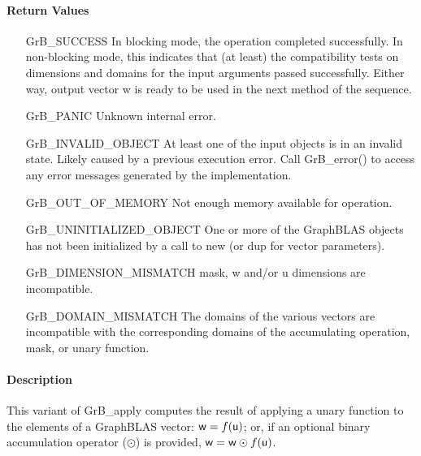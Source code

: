 \paragraph{Return Values}

\begin{itemize}[leftmargin=2.1in]
    \item[{\sf GrB\_SUCCESS}]         In blocking mode, the operation completed
	successfully. In non-blocking mode, this indicates that (at least) the compatibility 
    tests on dimensions and domains for the input arguments passed successfully. 
    Either way, output vector {\sf w} is ready to be used in the next method of 
    the sequence.

    \item[{\sf GrB\_PANIC}]            Unknown internal error.
    
    \item[{\sf GrB\_INVALID\_OBJECT}] At least one of the input objects is
	    in an invalid state. Likely caused by a previous execution error.
    Call {\sf GrB\_error()} to access 
    any error messages generated by the implementation.

    \item[{\sf GrB\_OUT\_OF\_MEMORY}]  Not enough memory available for operation.
    
    \item[{\sf GrB\_UNINITIALIZED\_OBJECT}] One or more of the GraphBLAS objects 
    has not been initialized by a call to {\sf new} (or {\sf dup} for vector
    parameters).
    
    \item[{\sf GrB\_DIMENSION\_MISMATCH}]  {\sf mask}, {\sf w} and/or {\sf u} dimensions are
    incompatible. 
    
    \item[{\sf GrB\_DOMAIN\_MISMATCH}]    The domains of the various vectors are
	incompatible with the corresponding domains of the accumulating operation, 
    mask, or unary function.
\end{itemize}

\paragraph{Description}

This variant of {\sf GrB\_apply} computes the result of applying a unary function
to the elements of a GraphBLAS vector:
${\sf w} = f({\sf u})$; or, if an optional binary accumulation 
operator ($\odot$) is provided, ${\sf w} = {\sf w} \odot f({\sf u})$.  

